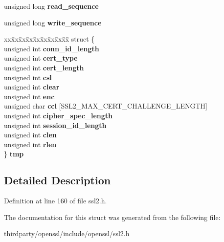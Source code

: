 \begin{DoxyCompactItemize}
\item 
\mbox{\label{structssl2__state__st_a8033b51398769bf5020d2146e8a42026}} 
unsigned long {\bfseries read\+\_\+sequence}
\item 
\mbox{\label{structssl2__state__st_a3a3f232e547d9f5edecb3bc3374fbc1a}} 
unsigned long {\bfseries write\+\_\+sequence}
\item 
\mbox{\label{structssl2__state__st_a98284b07b4aa5f8eaf0d0503052139db}} 
\begin{tabbing}
xx\=xx\=xx\=xx\=xx\=xx\=xx\=xx\=xx\=\kill
struct \{\\
\>unsigned int {\bfseries conn\_id\_length}\\
\>unsigned int {\bfseries cert\_type}\\
\>unsigned int {\bfseries cert\_length}\\
\>unsigned int {\bfseries csl}\\
\>unsigned int {\bfseries clear}\\
\>unsigned int {\bfseries enc}\\
\>unsigned char {\bfseries ccl} \mbox{[}SSL2\_MAX\_CERT\_CHALLENGE\_LENGTH\mbox{]}\\
\>unsigned int {\bfseries cipher\_spec\_length}\\
\>unsigned int {\bfseries session\_id\_length}\\
\>unsigned int {\bfseries clen}\\
\>unsigned int {\bfseries rlen}\\
\} {\bfseries tmp}\\

\end{tabbing}\end{DoxyCompactItemize}


\subsection{Detailed Description}


Definition at line 160 of file ssl2.\+h.



The documentation for this struct was generated from the following file\+:\begin{DoxyCompactItemize}
\item 
thirdparty/openssl/include/openssl/ssl2.\+h\end{DoxyCompactItemize}
